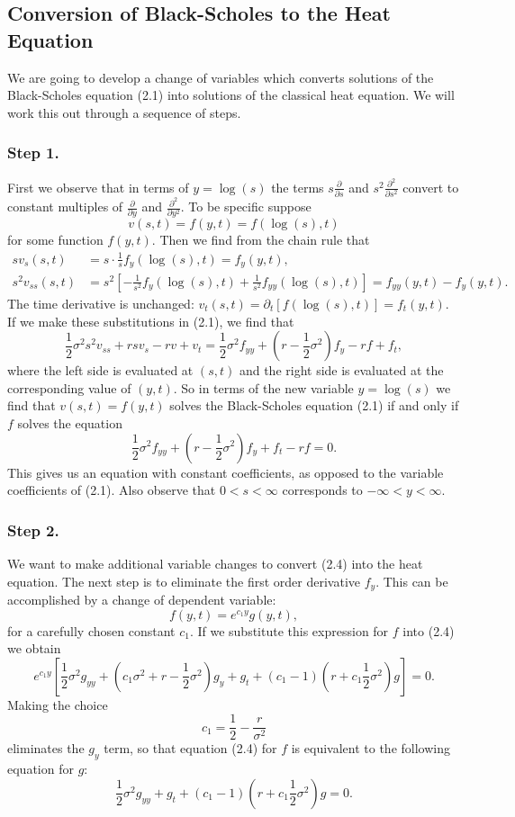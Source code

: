 \subsection{Conversion of Black-Scholes to the Heat Equation}

We are going to develop a change of variables which converts solutions of the Black-Scholes equation (2.1) into solutions of the classical heat equation. We will work this out through a sequence of steps.

\subsubsection*{Step 1.}
First we observe that in terms of \(y = \log(s)\) the terms \(s \frac{\partial}{\partial s}\) and \(s^2 \frac{\partial^2}{\partial s^2}\) convert to constant multiples of \(\frac{\partial}{\partial y}\) and \(\frac{\partial^2}{\partial y^2}\). To be specific suppose
\[
v(s,t) = f(y,t) = f(\log(s), t)
\]
for some function \(f(y,t)\). Then we find from the chain rule that
\begin{align*}
s v_s(s,t) &= s \cdot \frac{1}{s} f_y(\log(s), t) = f_y(y,t), \\
s^2 v_{ss}(s,t) &= s^2 \left[ -\frac{1}{s^2} f_y(\log(s), t) + \frac{1}{s^2} f_{yy}(\log(s), t) \right] = f_{yy}(y,t) - f_y(y,t).
\end{align*}
The time derivative is unchanged: \(v_t(s,t) = \partial_t [f(\log(s), t)] = f_t(y,t)\). If we make these substitutions in (2.1), we find that
\[
\frac{1}{2}\sigma^2 s^2 v_{ss} + r s v_s - r v + v_t = \frac{1}{2}\sigma^2 f_{yy} + \left(r - \frac{1}{2}\sigma^2\right) f_y - r f + f_t,
\]
where the left side is evaluated at \((s,t)\) and the right side is evaluated at the corresponding value of \((y,t)\). So in terms of the new variable \(y = \log(s)\) we find that \(v(s,t) = f(y,t)\) solves the Black-Scholes equation (2.1) if and only if \(f\) solves the equation
\[
\frac{1}{2}\sigma^2 f_{yy} + \left(r - \frac{1}{2}\sigma^2\right) f_y + f_t - r f = 0. \tag{2.4}
\]
This gives us an equation with constant coefficients, as opposed to the variable coefficients of (2.1). Also observe that \(0 < s < \infty\) corresponds to \(-\infty < y < \infty\).

\subsubsection*{Step 2.}
We want to make additional variable changes to convert (2.4) into the heat equation. The next step is to eliminate the first order derivative \(f_y\). This can be accomplished by a change of dependent variable:
\[
f(y,t) = e^{c_1 y} g(y,t),
\]
for a carefully chosen constant \(c_1\). If we substitute this expression for \(f\) into (2.4) we obtain
\[
e^{c_1 y} \left[ \frac{1}{2}\sigma^2 g_{yy} + (c_1 \sigma^2 + r - \frac{1}{2}\sigma^2) g_y + g_t + (c_1 - 1)(r + c_1 \frac{1}{2}\sigma^2) g \right] = 0.
\]
Making the choice
\[
c_1 = \frac{1}{2} - \frac{r}{\sigma^2}
\]
eliminates the \(g_y\) term, so that equation (2.4) for \(f\) is equivalent to the following equation for \(g\):
\[
\frac{1}{2}\sigma^2 g_{yy} + g_t + (c_1 - 1)(r + c_1 \frac{1}{2}\sigma^2) g = 0. \tag{2.5}
\]

